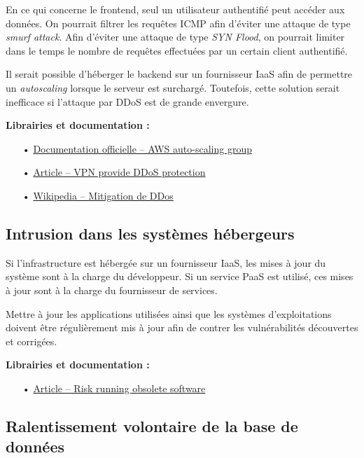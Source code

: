 En ce qui concerne le frontend, seul un utilisateur authentifié peut accéder aux données. On pourrait filtrer les requêtes ICMP afin d'éviter une attaque de type \textit{smurf attack}. Afin d'éviter une attaque de type \textit{SYN Flood}, on pourrait limiter dans le temps le nombre de requêtes effectuées par un certain client authentifié.

Il serait possible d'héberger le backend sur un fournisseur IaaS afin de permettre un \textit{autoscaling} lorsque le serveur est surchargé. Toutefois, cette solution serait inefficace si l'attaque par DDoS est de grande envergure.

\medskip
\textbf{Librairies et documentation :}

\begin{itemize}
\item[•] \href{https://docs.aws.amazon.com/autoscaling/ec2/userguide/AutoScalingGroup.html}{Documentation officielle -- AWS auto-scaling group}
\item[•] \href{https://vpn-services.bestreviews.net/vpn-provide-ddos-protection/}{Article -- VPN provide DDoS protection}
\item[•] \href{https://fr.wikipedia.org/wiki/Mitigation_de_DDoS}{Wikipedia -- Mitigation de DDos}
\end{itemize}

\subsection{Intrusion dans les systèmes hébergeurs}
\label{ssec:cm-intrusion}

Si l'infrastructure est hébergée sur un fournisseur IaaS, les mises à jour du système sont à la charge du développeur. Si un service PaaS est utilisé, ces mises à jour sont à la charge du fournisseur de services.

Mettre à jour les applications utilisées ainsi que les systèmes d'exploitations doivent être régulièrement mis à jour afin de contrer les vulnérabilités découvertes et corrigées.

\medskip
\textbf{Librairies et documentation :}

\begin{itemize}
\item[•] \href{http://techgenix.com/risk-running-obsolete-software-part1/}{Article -- Risk running obsolete software}
\end{itemize}

\subsection{Ralentissement volontaire de la base de données}
\label{ssec:cm-oversizing}


